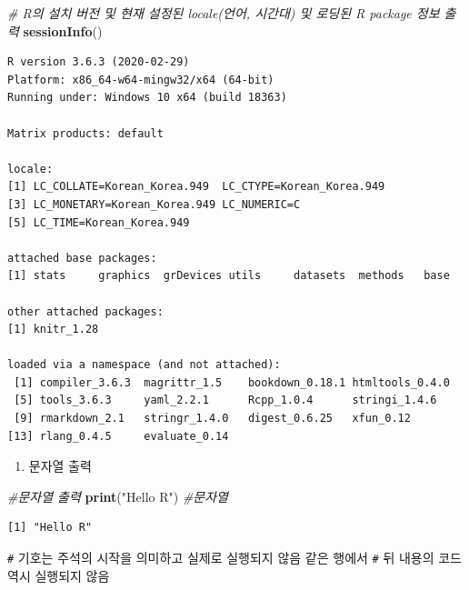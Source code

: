 \documentclass[
  11pt,
]{krantz}
\makeatletter
\newenvironment{Shaded}{\begin{snugshade}}{\end{snugshade}}
\newcommand{\CommentTok}[1]{\textcolor[rgb]{0.37,0.37,0.37}{\textit{#1}}}
\newcommand{\KeywordTok}[1]{\textcolor[rgb]{0.27,0.27,0.27}{\textbf{#1}}}
\newcommand{\NormalTok}[1]{#1}
\newcommand{\StringTok}[1]{\textcolor[rgb]{0.5,0.5,0.5}{#1}}
\providecommand{\tightlist}{%
  \setlength{\itemsep}{0pt}\setlength{\parskip}{0pt}}
\newenvironment{kframe}{%
\medskip{}
\setlength{\fboxsep}{.8em}
 \def\at@end@of@kframe{}%
 \ifinner\ifhmode%
  \def\at@end@of@kframe{\end{minipage}}%
  \begin{minipage}{\columnwidth}%
 \fi\fi%
 \def\FrameCommand##1{\hskip\@totalleftmargin \hskip-\fboxsep
 \colorbox{shadecolor}{##1}\hskip-\fboxsep
     \hskip-\linewidth \hskip-\@totalleftmargin \hskip\columnwidth}%
 \MakeFramed {\advance\hsize-\width
   \@totalleftmargin\z@ \linewidth\hsize
   \@setminipage}}%
 {\par\unskip\endMakeFramed%
 \at@end@of@kframe}
\renewenvironment{quote}{\begin{kframe}}{\end{kframe}}
\makeatother
\begin{document}
\footnotesize

\begin{Shaded}
\begin{Highlighting}[]
\CommentTok{# R의 설치 버전 및 현재 설정된 locale(언어, 시간대) 및 로딩된 R package 정보 출력}
\KeywordTok{sessionInfo}\NormalTok{() }
\end{Highlighting}
\end{Shaded}

\begin{verbatim}
R version 3.6.3 (2020-02-29)
Platform: x86_64-w64-mingw32/x64 (64-bit)
Running under: Windows 10 x64 (build 18363)

Matrix products: default

locale:
[1] LC_COLLATE=Korean_Korea.949  LC_CTYPE=Korean_Korea.949   
[3] LC_MONETARY=Korean_Korea.949 LC_NUMERIC=C                
[5] LC_TIME=Korean_Korea.949    

attached base packages:
[1] stats     graphics  grDevices utils     datasets  methods   base     

other attached packages:
[1] knitr_1.28

loaded via a namespace (and not attached):
 [1] compiler_3.6.3  magrittr_1.5    bookdown_0.18.1 htmltools_0.4.0
 [5] tools_3.6.3     yaml_2.2.1      Rcpp_1.0.4      stringi_1.4.6  
 [9] rmarkdown_2.1   stringr_1.4.0   digest_0.6.25   xfun_0.12      
[13] rlang_0.4.5     evaluate_0.14  
\end{verbatim}

\normalsize

\begin{enumerate}
\def\labelenumi{\arabic{enumi}.}
\setcounter{enumi}{1}
\tightlist
\item
  문자열 출력
\end{enumerate}

\footnotesize

\begin{Shaded}
\begin{Highlighting}[]
\CommentTok{#문자열 출력}
\KeywordTok{print}\NormalTok{(}\StringTok{"Hello R"}\NormalTok{) }\CommentTok{#문자열}
\end{Highlighting}
\end{Shaded}

\begin{verbatim}
[1] "Hello R"
\end{verbatim}

\normalsize

\begin{quote}
\texttt{\#} 기호는 주석의 시작을 의미하고 실제로 실행되지 않음 같은 행에서 \texttt{\#} 뒤 내용의 코드 역시 실행되지 않음
\end{quote}
\end{document}
